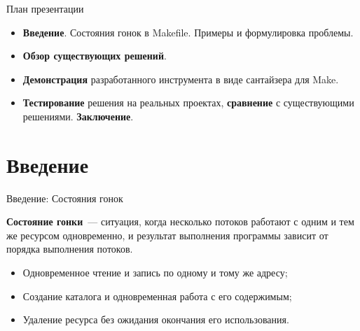     \begin{frame}{План презентации}
        \begin{itemize}
            \setlength\itemsep{1.1em}
            \item \textbf{Введение}. Состояния гонок в Makefile. Примеры и формулировка проблемы.
            \item \textbf{Обзор существующих решений}.
            \item \textbf{Демонстрация} разработанного инструмента в виде сантайзера для Make.
            \item \textbf{Тестирование} решения на реальных проектах, \textbf{сравнение} с существующими решениями. \textbf{Заключение}.
        \end{itemize}

    \end{frame}


    \section{Введение}

    \begin{frame}{Введение: Состояния гонок}

        \textbf{Состояние гонки}~--- ситуация, когда несколько потоков работают с одним и тем же ресурсом одновременно,
        и результат выполнения программы зависит от порядка выполнения потоков.

        \begin{itemize}
            \item Одновременное чтение и запись по одному и тому же адресу;
            \item Создание каталога и одновременная работа с его содержимым;
            \item Удаление ресурса без ожидания окончания его использования.
        \end{itemize}


    \end{frame}

